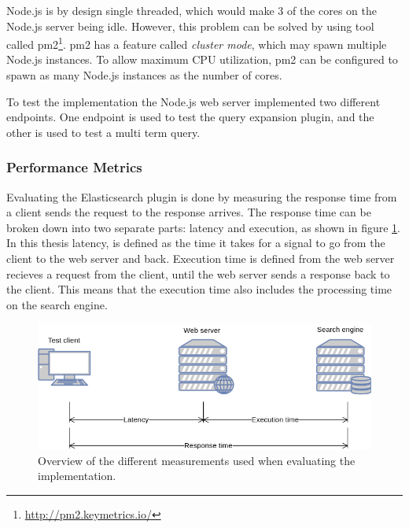 Node.js is by design single threaded, which would make 3 of the cores on the Node.js server being idle.
However, this problem can be solved by using tool called pm2\footnote{\url{http://pm2.keymetrics.io/}}.
pm2 has a feature called \textit{cluster mode}, which may spawn multiple Node.js instances.
To allow maximum CPU utilization, pm2 can be configured to spawn as many Node.js instances as the number of cores.

To test the implementation the Node.js web server implemented two different endpoints.
One endpoint is used to test the query expansion plugin,
and the other is used to test a multi term query.

\subsubsection{Performance Metrics}
Evaluating the Elasticsearch plugin is done by measuring the response time from a client sends the request to the response arrives.
The response time can be broken down into two separate parts: latency and execution, as shown in figure \ref{fig:latency-measurements}.
In this thesis latency, is defined as the time it takes for a signal to go from the client to the web server and back.
Execution time is defined from the web server recieves a request from the client, until the web server sends a response back to the client.
This means that the execution time also includes the processing time on the search engine.


\begin{figure}[h!]
  \centering \includegraphics[width=0.9\linewidth]{img/latency-measurements.png}
  \caption{Overview of the different measurements used when evaluating the implementation.}
  \label{fig:latency-measurements}
\end{figure}
